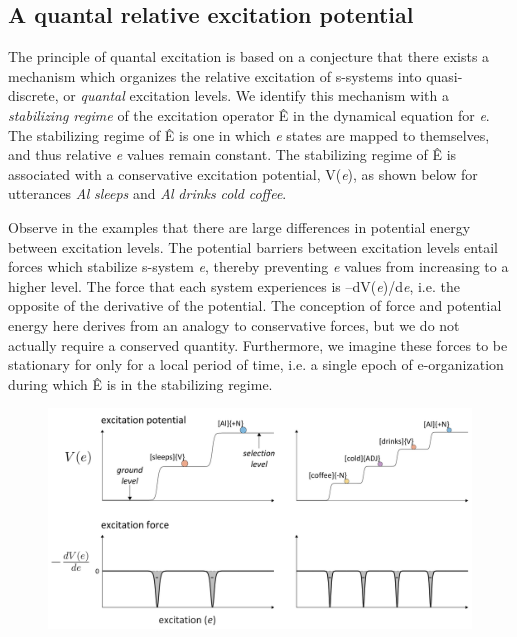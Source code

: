 \subsection{A quantal relative excitation potential}

The principle of quantal excitation is based on a conjecture that there exists a mechanism which organizes the relative excitation of s-systems into quasi-discrete, or \textit{quantal} excitation levels. We identify this mechanism with a \textit{stabilizing} \textit{regime} of the excitation operator Ê in the dynamical equation for \textit{e}. The stabilizing regime of Ê is one in which \textit{e} states are mapped to themselves, and thus relative \textit{e} values remain constant. The stabilizing regime of Ê is associated with a conservative excitation potential, V(\textit{e}), as shown below for utterances \textit{Al} \textit{sleeps} and \textit{Al} \textit{drinks} \textit{cold} \textit{coffee}. 

  Observe in the examples that there are large differences in potential energy between excitation levels. The potential barriers between excitation levels entail forces which stabilize s-system \textit{e}, thereby preventing \textit{e} values from increasing to a higher level. The force that each system experiences is –dV(\textit{e})/d\textit{e}, i.e. the opposite of the derivative of the potential. The conception of force and potential energy here derives from an analogy to conservative forces, but we do not actually require a conserved quantity. Furthermore, we imagine these forces to be stationary for only for a local period of time, i.e. a single epoch of e-organization during which Ê is in the stabilizing regime. 

  
\begin{figure}
\includegraphics[width=\textwidth]{figures/Tilsen-img23.png}
\caption{\missingcaption}
\label{fig:}
\end{figure}
 

